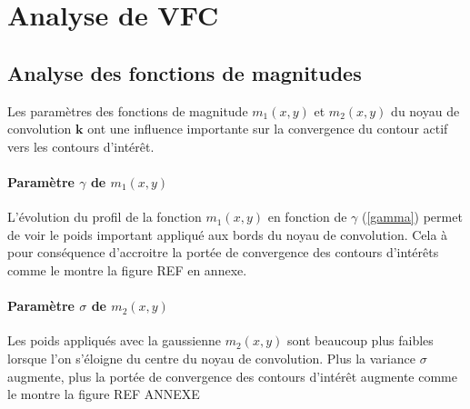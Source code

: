 
\section{Analyse de VFC}
\subsection{Analyse des fonctions de magnitudes}
Les paramètres des fonctions de magnitude $m_1(x,y)$ et $m_2(x,y)$ du noyau de convolution $\mathbf{k}$ ont une influence importante sur la convergence du contour actif vers les contours d'intérêt.
\paragraph*{Paramètre $\gamma$ de $m_1(x,y)$}
L'évolution du profil de la fonction $m_1(x,y)$ en fonction de $\gamma$ (\ref{gamma}) permet de voir le poids important appliqué aux bords du noyau de convolution. Cela à pour conséquence d'accroitre la portée de convergence des contours d'intérêts comme le montre la figure REF en annexe.

\paragraph*{Paramètre $\sigma$ de $m_2(x,y)$}
Les poids appliqués avec la gaussienne $m_2(x,y)$ sont beaucoup plus faibles lorsque l'on s'éloigne du centre du noyau de convolution. Plus la variance $\sigma$ augmente, plus la portée de convergence des contours d'intérêt augmente comme le montre la figure REF ANNEXE

